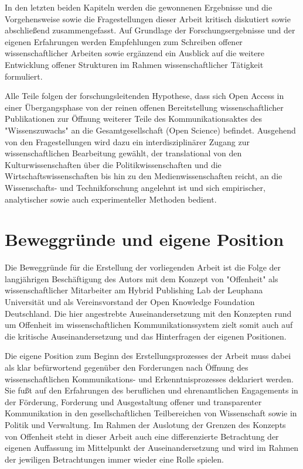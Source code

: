 In den letzten beiden Kapiteln werden die gewonnenen Ergebnisse und die Vorgehensweise sowie die Fragestellungen dieser Arbeit kritisch diskutiert sowie abschließend zusammengefasst. Auf Grundlage der Forschungsergebnisse und der eigenen Erfahrungen werden Empfehlungen zum Schreiben offener wissenschaftlicher Arbeiten sowie ergänzend ein Ausblick auf die weitere Entwicklung offener Strukturen im Rahmen wissenschaftlicher Tätigkeit formuliert.

Alle Teile folgen der forschungsleitenden Hypothese, dass sich Open Access in einer Übergangsphase von der reinen offenen Bereitstellung wissenschaftlicher Publikationen zur Öffnung weiterer Teile des Kommunikationsaktes des "Wissenszuwachs" \cite{Luhmann1998} an die Gesamtgesellschaft (Open Science) befindet. Ausgehend von den Fragestellungen wird dazu ein interdisziplinärer Zugang zur wissenschaftlichen Bearbeitung gewählt, der translational von den Kulturwissenschaften über die Politikwissenschaften und die Wirtschaftswissenschaften bis hin zu den Medienwissenschaften reicht, an die Wissenschafts- und Technikforschung angelehnt ist und sich empirischer, analytischer sowie auch experimenteller Methoden bedient.

\section{Beweggründe und eigene Position}

Die Beweggründe für die Erstellung der vorliegenden Arbeit ist die Folge der langjährigen Beschäftigung des Autors mit dem Konzept von "Offenheit" als wissenschaftlicher Mitarbeiter am Hybrid Publishing Lab der Leuphana Universität und als Vereinsvorstand der Open Knowledge Foundation Deutschland. Die hier angestrebte Auseinandersetzung mit den Konzepten rund um Offenheit im wissenschaftlichen Kommunikationssystem zielt somit auch auf die kritische Auseinandersetzung und das Hinterfragen der eigenen Positionen.

Die eigene Position zum Beginn des Erstellungsprozesses der Arbeit muss dabei als klar befürwortend gegenüber den Forderungen nach Öffnung des wissenschaftlichen Kommunikations- und Erkenntnisprozesses deklariert werden. Sie fußt auf den Erfahrungen des beruflichen und ehrenamtlichen Engagements in der Förderung, Forderung und Ausgestaltung offener und transparenter Kommunikation in den gesellschaftlichen Teilbereichen von Wissenschaft sowie in Politik und Verwaltung. Im Rahmen der Auslotung der Grenzen des Konzepts von Offenheit steht in dieser Arbeit auch eine differenzierte Betrachtung der eigenen Auffassung im Mittelpunkt der Auseinandersetzung und wird im Rahmen der jewiligen Betrachtungen immer wieder eine Rolle spielen.

